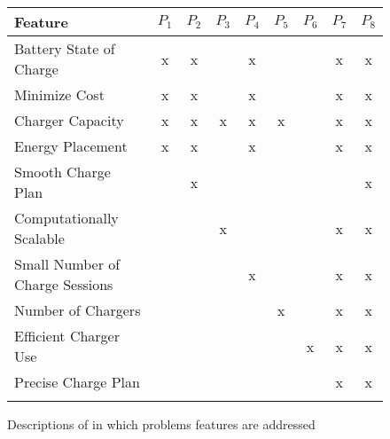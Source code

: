 \begin{figure*}\label{fig:formulation:features}\centering
\newcommand{\grayhline}{\arrayrulecolor{gray!20} \hline \arrayrulecolor{black}}
\begin{tabular}{l c c c c c c c c}
 Feature                        & $P_1$ & $P_2$ & $P_3$ & $P_4$ & $P_5$ & $P_6$ & $P_7$ & $P_8$ \\ \hline 
Battery State of Charge         &   x   &   x   &       &   x   &       &       &   x   &   x   \\ \grayhline      
Minimize Cost                   &   x   &   x   &       &   x   &       &       &   x   &   x   \\ \grayhline           
Charger Capacity                &   x   &   x   &   x   &   x   &   x   &       &   x   &   x   \\ \grayhline      
Energy Placement                &   x   &   x   &       &   x   &       &       &   x   &   x   \\ \grayhline      
Smooth Charge Plan              &       &   x   &       &       &       &       &       &   x   \\ \grayhline      
Computationally Scalable        &       &       &   x   &       &       &       &   x   &   x   \\ \grayhline      
Small Number of Charge Sessions &       &       &       &   x   &       &       &   x   &   x   \\ \grayhline      
Number of Chargers              &       &       &       &       &   x   &       &   x   &   x   \\ \grayhline      
Efficient Charger Use           &       &       &       &       &       &   x   &   x   &   x   \\ \grayhline      
Precise Charge Plan             &       &       &       &       &       &       &   x   &   x   \\ \grayhline      
\end{tabular} 
\caption{Descriptions of in which problems features are addressed}
\label{fig:formulation:features}
\end{figure*}

